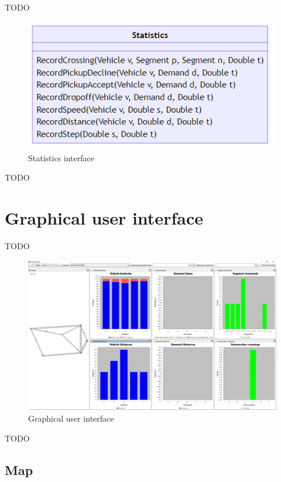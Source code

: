 \documentclass[10pt,twocolumn]{article}
\begin{document}
TODO

\begin{figure}[htbp]
    \includegraphics[width=\columnwidth]{../../diagrams/statistics/classes.png}
    \caption{Statistics interface}
    \label{fig:statistics-interface}
\end{figure}

TODO

\section{Graphical user interface}
\label{sec:gui}

TODO

\begin{figure}[tbp]
    \includegraphics[width=\textwidth]{../../screenshots/basic-simulation.png}
    \caption{Graphical user interface}
    \label{fig:gui}
\end{figure}

TODO

\subsection{Map}
\end{document}
